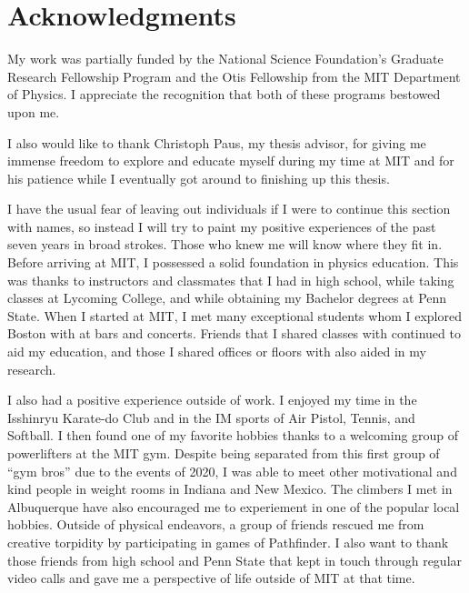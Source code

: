 % 

\cleardoublepage

\section*{Acknowledgments}

My work was partially funded by the National Science Foundation's
Graduate Research Fellowship Program and
the Otis Fellowship from the MIT Department of Physics.
I appreciate the recognition that both of these programs bestowed upon me.

I also would like to thank Christoph Paus, my thesis advisor,
for giving me immense freedom to explore and educate myself during my time at MIT and
for his patience while I eventually got around to finishing up this thesis.

I have the usual fear of leaving out individuals if I were to continue this section with names,
so instead I will try to paint my positive experiences of the past seven years in broad strokes.
Those who knew me will know where they fit in.
Before arriving at MIT, I possessed a solid foundation in physics education.
This was thanks to instructors and classmates that I had in high school,
while taking classes at Lycoming College, and while obtaining my Bachelor degrees at Penn State.
When I started at MIT,
I met many exceptional students whom I explored Boston with at bars and concerts.
Friends that I shared classes with continued to aid my education,
and those I shared offices or floors with also aided in my research.

I also had a positive experience outside of work.
I enjoyed my time in the Isshinryu Karate-do Club and
in the IM sports of Air Pistol, Tennis, and Softball.
I then found one of my favorite hobbies
thanks to a welcoming group of powerlifters at the MIT gym.
Despite being separated from this first group of ``gym bros'' due to the events of 2020,
I was able to meet other motivational and kind people in weight rooms in Indiana and New Mexico.
The climbers I met in Albuquerque have also encouraged me to experiement in one of the popular local hobbies.
Outside of physical endeavors,
a group of friends rescued me from creative torpidity by participating in games of Pathfinder.
I also want to thank those friends from high school and Penn State that kept in touch
through regular video calls and gave me a perspective of life outside of MIT at that time.

